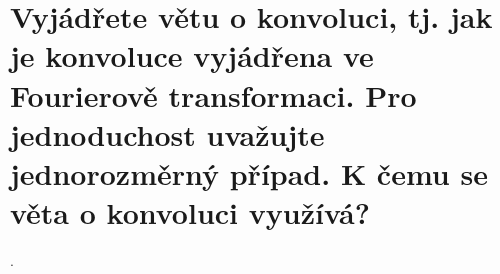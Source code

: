 \section{Vyjádřete větu o konvoluci, tj. jak je konvoluce vyjádřena ve Fourierově transformaci. Pro jednoduchost 
uvažujte jednorozměrný případ. K čemu se věta o konvoluci využívá?}.